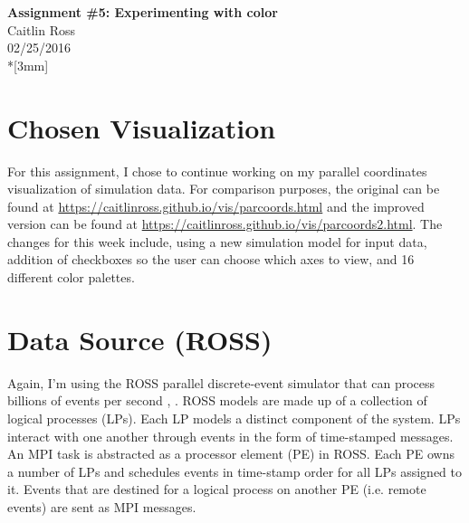 \documentclass[12pt]{article}
\begin{document}
\thispagestyle{empty}
\begin{center}
{\Large\bf Assignment \#5: Experimenting with color}
\vspace{3mm}
\\Caitlin Ross 
\\02/25/2016
\\*[3mm]
\end{center}
\section{Chosen Visualization}
For this assignment, I chose to continue working on my parallel coordinates visualization of simulation data.  For comparison purposes, the original can be found at \url{https://caitlinross.github.io/vis/parcoords.html} and the improved version can be found at \url{https://caitlinross.github.io/vis/parcoords2.html}.  The changes for this week include, using a new simulation model for input data, addition of checkboxes so the user can choose which axes to view, and 16 different color palettes.  

\section{Data Source (ROSS)}
Again, I'm using the
ROSS parallel discrete-event simulator that
can process billions of events per second \cite{Holder}, \cite{Bauer}. ROSS
models are made up of a collection of logical processes (LPs).
Each LP models a distinct component of the system. LPs
interact with one another through events in the form of time-stamped messages. An MPI task is abstracted as a processor
element (PE) in ROSS. Each PE owns a number of LPs and
schedules events in time-stamp order for all LPs assigned to
it. Events that are destined for a logical process on another
PE (i.e. remote events) are sent as MPI messages. 
\end{document}
